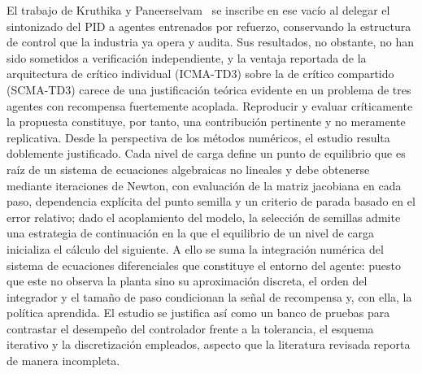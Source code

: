 \documentclass[final,5p,times,twocolumn,authoryear,11pt]{elsarticle}
\begin{document}
El trabajo de Kruthika y Paneerselvam~\citep{kruthika2025novel} se inscribe en ese vacío al delegar el sintonizado del PID a agentes entrenados por refuerzo, conservando la estructura de control que la industria ya opera y audita. Sus resultados, no obstante, no han sido sometidos a verificación independiente, y la ventaja reportada de la arquitectura de crítico individual (ICMA-TD3) sobre la de crítico compartido (SCMA-TD3) carece de una justificación teórica evidente en un problema de tres agentes con recompensa fuertemente acoplada. Reproducir y evaluar críticamente la propuesta constituye, por tanto, una contribución pertinente y no meramente replicativa. Desde la perspectiva de los métodos numéricos, el estudio resulta doblemente justificado. Cada nivel de carga define un punto de equilibrio que es raíz de un sistema de ecuaciones algebraicas no lineales y debe obtenerse mediante iteraciones de Newton, con evaluación de la matriz jacobiana en cada paso, dependencia explícita del punto semilla y un criterio de parada basado en el error relativo; dado el acoplamiento del modelo, la selección de semillas admite una estrategia de continuación en la que el equilibrio de un nivel de carga inicializa el cálculo del siguiente. A ello se suma la integración numérica del sistema de ecuaciones diferenciales que constituye el entorno del agente: puesto que este no observa la planta sino su aproximación discreta, el orden del integrador y el tamaño de paso condicionan la señal de recompensa y, con ella, la política aprendida. El estudio se justifica así como un banco de pruebas para contrastar el desempeño del controlador frente a la tolerancia, el esquema iterativo y la discretización empleados, aspecto que la literatura revisada reporta de manera incompleta.
\end{document}
